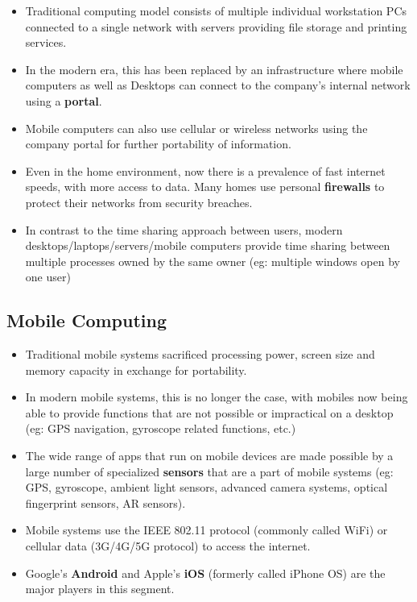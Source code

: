 \documentclass{article}
\theoremstyle{plain}
\theoremstyle{definition}
\begin{document}
\begin{itemize}
    \item Traditional computing model consists of multiple individual workstation PCs connected to a single network with servers providing file storage and printing services. 
    
    \item In the modern era, this has been replaced by an infrastructure where mobile computers as well as Desktops can connect to the company's internal network using a \textbf{portal}. 
    
    \item Mobile computers can also use cellular or wireless networks using the company portal for further portability of information. 
    
    \item Even in the home environment, now there is a prevalence of fast internet speeds, with more access to data. Many homes use personal \textbf{firewalls} to protect their networks from security breaches.
    
    \item In contrast to the time sharing approach between users, modern desktops/laptops/servers/mobile computers provide time sharing between multiple processes owned by the same owner (eg: multiple windows open by one user)
\end{itemize}

\subsection{Mobile Computing}
\begin{itemize}
    \item Traditional mobile systems sacrificed processing power, screen size and memory capacity in exchange for portability. 
    
    \item In modern mobile systems, this is no longer the case, with mobiles now being able to provide functions that are not possible or impractical on a desktop (eg: GPS navigation, gyroscope related functions, etc.)
    
    \item The wide range of apps that run on mobile devices are made possible by a large number of specialized \textbf{sensors} that are a part of mobile systems (eg: GPS, gyroscope, ambient light sensors, advanced camera systems, optical fingerprint sensors, AR sensors).
    
    \item Mobile systems use the IEEE 802.11 protocol (commonly called WiFi) or cellular data (3G/4G/5G protocol) to access the internet. 
    
    \item Google's \textbf{Android} and Apple's \textbf{iOS} (formerly called iPhone OS) are the major players in this segment.
\end{itemize}
\end{document}
